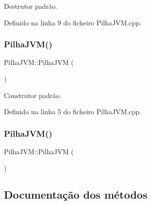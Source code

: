 Destrutor padrão. 



Definido na linha 9 do ficheiro Pilha\+J\+V\+M.\+cpp.

\mbox{\label{classPilhaJVM_a7f0451ca9cf124f5098d43928566fadf}} 
\subsubsection{\texorpdfstring{Pilha\+J\+V\+M()}{PilhaJVM()}\hspace{0.1cm}{\footnotesize\ttfamily [1/2]}}
{\footnotesize\ttfamily Pilha\+J\+V\+M\+::\+Pilha\+J\+VM (\begin{DoxyParamCaption}{ }\end{DoxyParamCaption})\hspace{0.3cm}{\ttfamily [private]}}



Construtor padrão. 



Definido na linha 5 do ficheiro Pilha\+J\+V\+M.\+cpp.

\mbox{\label{classPilhaJVM_a051085f51d79d3333356c5d36bef4687}} 
\subsubsection{\texorpdfstring{Pilha\+J\+V\+M()}{PilhaJVM()}\hspace{0.1cm}{\footnotesize\ttfamily [2/2]}}
{\footnotesize\ttfamily Pilha\+J\+V\+M\+::\+Pilha\+J\+VM (\begin{DoxyParamCaption}\item[{\hyperlink{classPilhaJVM}{Pilha\+J\+VM} const \&}]{ }\end{DoxyParamCaption})\hspace{0.3cm}{\ttfamily [private]}}



\subsection{Documentação dos métodos}
\mbox{\label{classPilhaJVM_a64d7185bc812d3c81e5270c54c212e07}} 

